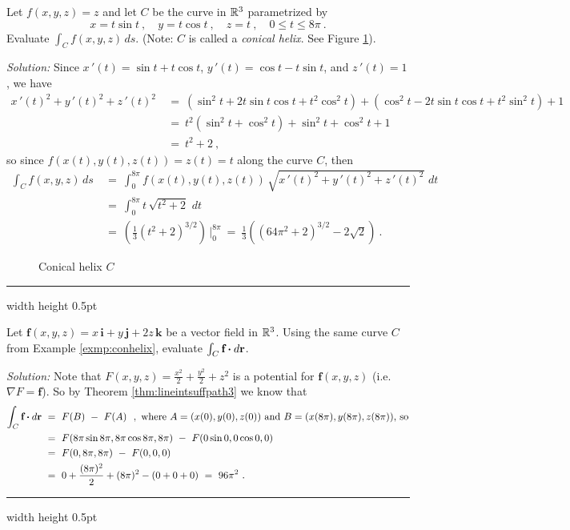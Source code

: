 \begin{exmp}\label{exmp:conhelix}
 Let $f(x,y,z) = z$ and let $C$ be the curve in $\mathbb{R}^{3}$ parametrized by
 \begin{displaymath}
  x=t\sin t ~,\quad y=t\cos t ~,\quad z=t ~,\quad 0\le t \le 8\pi ~.
 \end{displaymath}
 Evaluate $\int_C f(x,y,z)\,ds$. (Note:
 $C$ is called a \emph{conical helix}. See Figure \ref{fig:conhelix}).\smallskip
 \par\noindent \emph{Solution:} Since $x\,'(t)=\sin t + t\cos t$, $y\,'(t)=\cos t - t\sin t$, and $z\,'(t)=1$, we have
 \begin{align*}
  x\,'(t)^2 + y\,'(t)^2 + z\,'(t)^2 ~&=~ (\sin^2 t + 2t\sin t \cos t + t^2 \cos^2 t) + (\cos^2 t - 2t\sin t \cos t +
   t^2 \sin^2 t) + 1\\
   &=~ t^2 (\sin^2 t + \cos^2 t) + \sin^2 t + \cos^2 t + 1\\
   &=~ t^2 + 2 ~,
 \end{align*}
 so since $f(x(t),y(t),z(t)) = z(t) = t$ along the curve $C$, then
 \begin{align*}
  \int_C f(x,y,z)\,ds ~&=~ \int_0^{8\pi} f(x(t),y(t),z(t)) \,\sqrt{x\,'(t)^2 + y\,'(t)^2 + z\,'(t)^2}\,\,dt\\
   &=~ \int_0^{8\pi} t\,\sqrt{t^2 + 2}\,\,dt\\
   &=~ \left( \frac{1}{3} (t^2 + 2)^{3/2} \right) \,\Bigg|_0^{8\pi}
   ~=~ \frac{1}{3} \left( (64\pi^2 + 2)^{3/2} - 2\sqrt{2} \right) ~.
 \end{align*}
 \begin{figure}[h]
  \begin{center}
   
  \end{center}
  \caption[]{\quad Conical helix $C$}
  \label{fig:conhelix}
 \end{figure}
\end{exmp}\smallskip
\hrule width \textwidth height 0.5pt
\begin{exmp}
 Let $\mathbf{f}(x,y,z) = x\,\mathbf{i} + y\,\mathbf{j} + 2z\,\mathbf{k}$ be a vector field in $\mathbb{R}^{3}$.
 Using the same curve $C$ from Example \ref{exmp:conhelix}, evaluate $\int_{C} \textbf{f} \bm{\cdot} d\textbf{r}$.\smallskip
 \par\noindent \emph{Solution:} Note that $F(x,y,z)=\frac{x^2}{2}+\frac{y^2}{2}+z^2$ is a potential for
 $\mathbf{f}(x,y,z)$ (i.e. $\nabla F = \mathbf{f}$). So by Theorem \ref{thm:lineintsuffpath3} we know that
 \begin{align*}
  \int_{C} \textbf{f} \bm{\cdot} d\textbf{r} ~&=~ F(B) ~-~ F(A) ~~,~\text{where $A=(x(0),y(0),z(0))$ and $B=(x(8\pi),y(8\pi),z(8\pi))$, so}\\
   &=~ F(8\pi\sin 8\pi,8\pi\cos 8\pi,8\pi) ~-~ F(0\sin 0,0\cos 0,0)\\
   &=~ F(0,8\pi,8\pi) ~-~ F(0,0,0)\\
   &=~ 0+\frac{(8\pi)^2}{2} + (8\pi)^2 - (0+0+0)
   ~=~ 96\pi^2 ~.
 \end{align*}
\end{exmp}
\hrule width \textwidth height 0.5pt
\medskip

